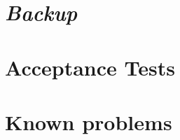 \begin{appendix}
\begin{comment}
%

\chapter{\textit{Migration of the \appName\ system}}

\end{comment}
\chapter{\textit{Backup}}


\chapter{Acceptance Tests}

\chapter{Known problems}
\label{chap:knownProblems}


%

\end{appendix}
